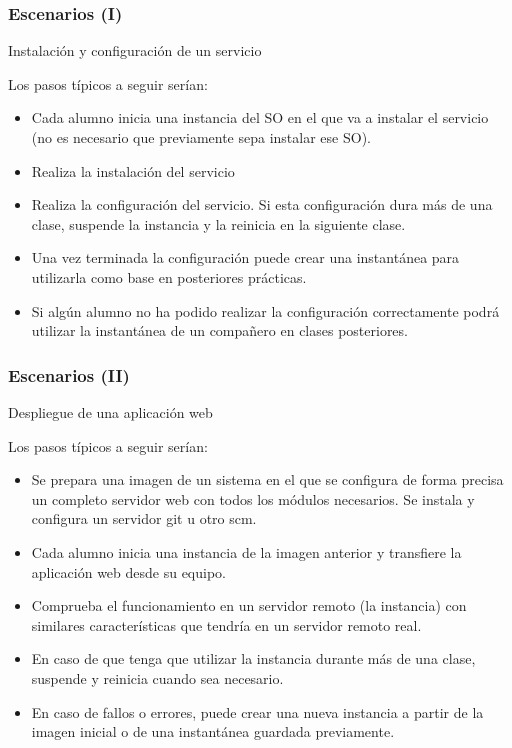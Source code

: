 \documentclass{beamer}
\begin{document}
\begin{frame}
  \frametitle{Escenarios (I)}
  \begin{description}
  \item[Instalación y configuración de un servicio]
  \end{description}
  Los pasos típicos a seguir serían:
  \begin{itemize}
  \item Cada alumno inicia una instancia del SO en el que va a instalar el
    servicio (no es necesario que previamente sepa instalar ese SO).
  \item Realiza la instalación del servicio
  \item Realiza la configuración del servicio. Si esta configuración dura
    más de una clase, suspende la instancia y la reinicia en la siguiente
    clase.
  \item Una vez terminada la configuración puede crear una instantánea para
    utilizarla como base en posteriores prácticas.
  \item Si algún alumno no ha podido realizar la configuración correctamente
    podrá utilizar la instantánea de un compañero en clases posteriores.
  \end{itemize}
\end{frame}

\begin{frame}
  \frametitle{Escenarios (II)}
  \begin{description}
  \item[Despliegue de una aplicación web]
  \end{description}
  Los pasos típicos a seguir serían:
  \begin{itemize}
  \item Se prepara una imagen de un sistema en el que se configura de forma
    precisa un completo servidor web con todos los módulos necesarios. Se
    instala y configura un servidor git u otro scm.
  \item Cada alumno inicia una instancia de la imagen anterior y transfiere la
    aplicación web desde su equipo.
  \item Comprueba el funcionamiento en un servidor remoto (la instancia) con
    similares características que tendría en un servidor remoto real.
  \item En caso de que tenga que utilizar la instancia durante más de una clase,
    suspende y reinicia cuando sea necesario.
  \item En caso de fallos o errores, puede crear una nueva instancia a partir de
    la imagen inicial o de una instantánea guardada previamente.
  \end{itemize}
\end{frame}
\end{document}
